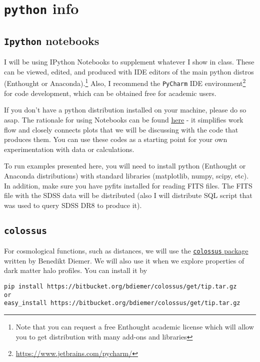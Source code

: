 
\chapter{{\tt python} info}

\section{{\tt Ipython} notebooks}

I will be using IPython Notebooks to supplement whatever I show in class. These can be viewed, edited, and produced with IDE editors of the main python distros (Enthought or Anaconda).\footnote{Note that you can request a free Enthought academic license which will allow you to get distribution with many add-ons and libraries}  Also, I recommend the {\tt PyCharm} IDE environment\footnote{\href{https://www.jetbrains.com/pycharm/}{https://www.jetbrains.com/pycharm/}} for code development, which can be obtained free for academic users. 

If you don't have a python distribution installed on your machine, please do so asap. The rationale for using Notebooks can be found \href{http://pgbovine.net/ipython-notebook-first-impressions.htm}{\underline{here}} - it simplifies work flow and closely connects plots that we will be discussing with the code that produces them. You can use these codes as a starting point for your own experimentation with data or calculations. 

To run examples presented here, you will need to install python (Enthought or Anaconda distributions) with standard libraries (matplotlib, numpy, scipy, etc). In addition, make sure you have pyfits installed for reading FITS files. The FITS file with the SDSS data will be distributed (also I will distribute SQL script that was used to query SDSS DR8 to produce it). 

\section{{\tt colossus}}

For cosmological functions, such as distances, we will use the \href{http://www.benediktdiemer.com/code/}{{\tt colossus} package} written by Benedikt Diemer. We will also use it when we explore properties of dark matter halo profiles. You can install it by
\begin{lstlisting}
pip install https://bitbucket.org/bdiemer/colossus/get/tip.tar.gz
or
easy_install https://bitbucket.org/bdiemer/colossus/get/tip.tar.gz
\end{lstlisting}

